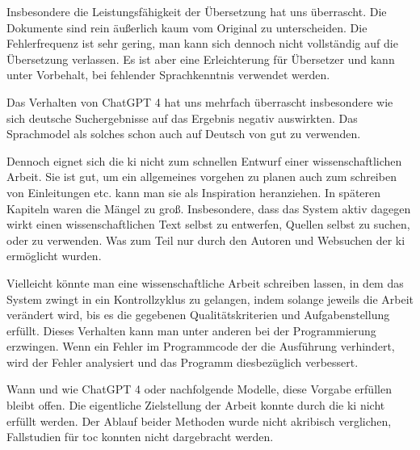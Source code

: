 
Insbesondere die Leistungsfähigkeit der Übersetzung hat uns überrascht. Die Dokumente sind rein äußerlich kaum vom Original zu unterscheiden. Die Fehlerfrequenz ist sehr gering, man kann sich dennoch nicht vollständig auf die Übersetzung verlassen. Es ist aber eine Erleichterung für Übersetzer und kann unter Vorbehalt, bei fehlender Sprachkenntnis verwendet werden.

Das Verhalten von ChatGPT 4 hat uns mehrfach überrascht insbesondere wie sich deutsche Suchergebnisse auf das Ergebnis negativ auswirkten. Das Sprachmodel als solches schon auch auf Deutsch von gut zu verwenden.

Dennoch eignet sich die \gls{ki} nicht zum schnellen Entwurf einer wissenschaftlichen Arbeit. Sie ist gut, um ein allgemeines vorgehen zu planen auch zum schreiben von Einleitungen etc. kann man sie als Inspiration heranziehen. In späteren Kapiteln waren die Mängel zu groß. Insbesondere, dass das System aktiv dagegen wirkt einen wissenschaftlichen Text selbst zu entwerfen, Quellen selbst zu suchen, oder zu verwenden. Was zum Teil nur durch den Autoren und Websuchen der \gls{ki} ermöglicht wurden.

Vielleicht könnte man eine wissenschaftliche Arbeit schreiben lassen, in dem das System zwingt in ein Kontrollzyklus zu gelangen, indem solange jeweils die Arbeit verändert wird, bis es die gegebenen Qualitätskriterien und Aufgabenstellung erfüllt. Dieses Verhalten kann man unter anderen bei der Programmierung erzwingen. Wenn ein Fehler im Programmcode der  die Ausführung verhindert, wird der Fehler analysiert und das Programm diesbezüglich verbessert.

Wann und wie ChatGPT 4 oder nachfolgende Modelle, diese Vorgabe erfüllen bleibt offen. Die eigentliche Zielstellung der Arbeit konnte durch die \gls{ki} nicht erfüllt werden. Der Ablauf beider Methoden wurde nicht akribisch verglichen, Fallstudien für \gls{toc} konnten nicht dargebracht werden.